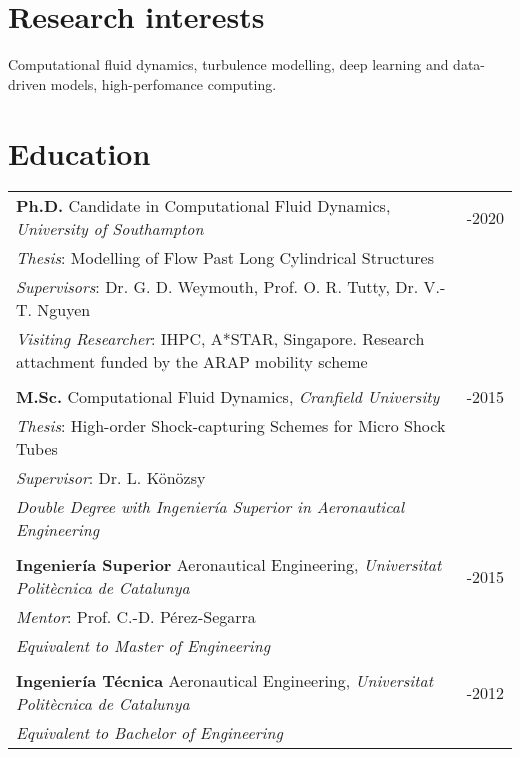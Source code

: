 \documentclass[line]{res}
\newenvironment{p}
  {\begin{adjustwidth}{-10pt}{0pt}}
  {\end{adjustwidth}}
\newenvironment{p3}
  {\begin{adjustwidth}{-16pt}{0pt}
  \vspace{3pt}}
  {\end{adjustwidth}}
\begin{document}


\begin{resume}
\section{}
\vspace{-15pt} 
\hfill

\noindent

\section{Research interests}
\begin{p}
Computational fluid dynamics, turbulence modelling, deep learning and data-driven models, high-perfomance computing. 
\end{p}
 
\section{Education}
\begin{p3}
\begin{tabular}{p{} >{\raggedleft\arraybackslash}p{}}
\textbf{Ph.D.} Candidate in Computational Fluid Dynamics, \textit{University of Southampton} &  2015-2020\\
\textit{Thesis}: Modelling of Flow Past Long Cylindrical Structures & \\
\textit{Supervisors}: Dr. G. D. Weymouth, Prof. O. R. Tutty, Dr. V.-T. Nguyen & \\
\textit{Visiting Researcher}: IHPC, A*STAR, Singapore. Research attachment funded by the ARAP mobility scheme&  \\
\\
\textbf{M.Sc.} Computational Fluid Dynamics, \textit{Cranfield University} &  2014-2015\\ 
\textit{Thesis}: High-order Shock-capturing Schemes for Micro Shock Tubes & \\
\textit{Supervisor}: Dr. L. K\"{o}n\"{o}zsy & \\
\textit{Double Degree with Ingenier\'{i}a Superior in Aeronautical Engineering} & \\
\\
\textbf{Ingenier\'{i}a Superior} Aeronautical Engineering, \textit{Universitat Polit\`{e}cnica de Catalunya} &  2012-2015\\ 
\textit{Mentor}: Prof. C.-D. P\'{e}rez-Segarra & \\
\textit{Equivalent to Master of Engineering} & \\
\\
\textbf{Ingenier\'{i}a T\'{e}cnica} Aeronautical Engineering, \textit{Universitat Polit\`{e}cnica de Catalunya} &  2009-2012\\ 
\textit{Equivalent to Bachelor of Engineering} & 
\end{tabular}
\end{p3}


\end{resume}
\end{document}
